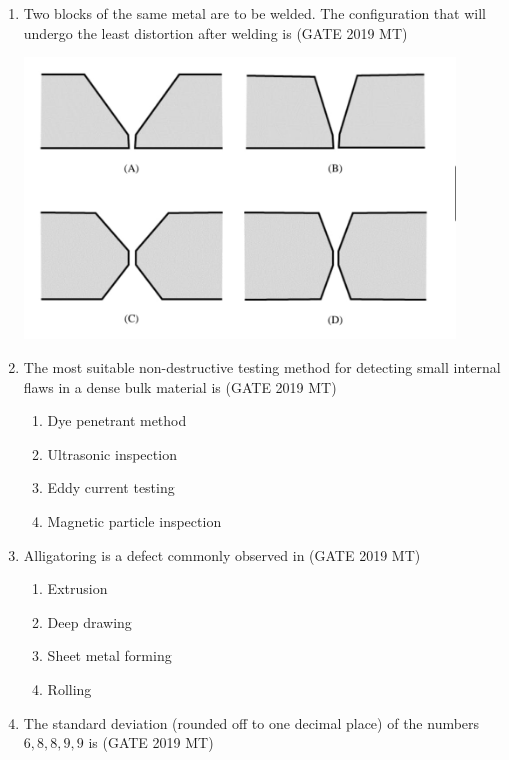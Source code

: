 \documentclass[12pt]{article}
\begin{document}
\begin{enumerate}
\item Two blocks of the same metal are to be welded. The configuration that will undergo the least distortion after welding is \hspace{1em} (GATE 2019 MT)
\begin{center}
    \includegraphics[width=0.9\textwidth]{images/qq20oi.jpg}
\end{center}

\item The most suitable non-destructive testing method for detecting small internal flaws in a dense bulk material is \hspace{1em} (GATE 2019 MT)
\begin{enumerate}[label=(\alph*)]
    \item Dye penetrant method
    \item Ultrasonic inspection
    \item Eddy current testing
    \item Magnetic particle inspection
\end{enumerate}

\item Alligatoring is a defect commonly observed in \hspace{1em} (GATE 2019 MT)
\begin{enumerate}[label=(\alph*)]
    \item Extrusion
    \item Deep drawing
    \item Sheet metal forming
    \item Rolling
\end{enumerate}

\item The standard deviation (rounded off to one decimal place) of the numbers $6, 8, 8, 9, 9$ is \hspace{1em} (GATE 2019 MT)


\end{enumerate}
\end{document}
